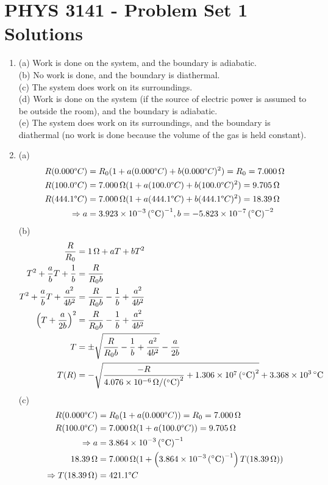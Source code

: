 \documentclass[a4paper,12pt]{article}
\begin{document}
\section*{PHYS 3141 - Problem Set 1 Solutions}

\begin{enumerate}
	
	\item (a) Work is done on the system, and the boundary is adiabatic. \\
	(b) No work is done, and the boundary is diathermal. \\
	(c) The system does work on its surroundings. \\
	(d) Work is done on the system (if the source of electric power is assumed to be outside the room), and the boundary is adiabatic. \\
	(e) The system does work on its surroundings, and the boundary is diathermal (no work is done because the volume of the gas is held constant).
	
	\item (a)
	\begin{align*}
		R(0.000 \degree C) &= R_0 (1 + a(0.000 \degree C) + b(0.000 \degree C)^2) = R_0 = \SI{7.000}{\Omega} \\
		R(100.0 \degree C) &= \SI{7.000}{\Omega} (1 + a(100.0 \degree C) + b(100.0 \degree C)^2) = \SI{9.705}{\Omega} \\
		R(444.1 \degree C) &= \SI{7.000}{\Omega} (1 + a(444.1 \degree C) + b(444.1 \degree C)^2) = \SI{18.39}{\Omega} \\
		\Rightarrow a &= \SI{3.923e-3}{(\degree C)^{-1}}, b = \SI{-5.823e-7}{(\degree C)^{-2}}
	\end{align*}
	(b)
	\begin{align*}
		\frac{R}{R_0} &= \SI{1}{\Omega} + aT + bT^2 \\
		T^2 + \frac{a}{b} T + \frac{1}{b} &= \frac{R}{R_0 b} \\
		T^2 + \frac{a}{b} T + \frac{a^2}{4b^2} &= \frac{R}{R_0 b} - \frac{1}{b} + \frac{a^2}{4b^2} \\
		\left( T + \frac{a}{2b} \right)^2 &= \frac{R}{R_0 b} - \frac{1}{b} + \frac{a^2}{4b^2} \\
		T &= \pm \sqrt{\frac{R}{R_0 b} - \frac{1}{b} + \frac{a^2}{4b^2}} - \frac{a}{2b} \\
		T(R) &= - \sqrt{\frac{-R}{\SI{4.076e-6}{\Omega / \left(\degree C\right)^2}} + \SI{1.306e7}{\left(\degree C\right)^2}} + \SI{3.368e3}{\degree C}
	\end{align*}
	(c)
	\begin{align*}
		R(0.000 \degree C) &= R_0 (1 + a(0.000 \degree C)) = R_0 = \SI{7.000}{\Omega} \\
		R(100.0 \degree C) &= \SI{7.000}{\Omega} (1 + a(100.0 \degree C)) =  \SI{9.705}{\Omega} \\
		\Rightarrow a &= \SI{3.864e-3}{(\degree C)^{-1}} \\
		\SI{18.39}{\Omega} &= \SI{7.000}{\Omega} (1 + \left( \SI{3.864e-3}{(\degree C)^{-1}} \right) T(\SI{18.39}{\Omega})) \\
		\Rightarrow T(\SI{18.39}{\Omega}) &= 421.1 \degree C
	\end{align*}
	

\end{enumerate}
\end{document}
